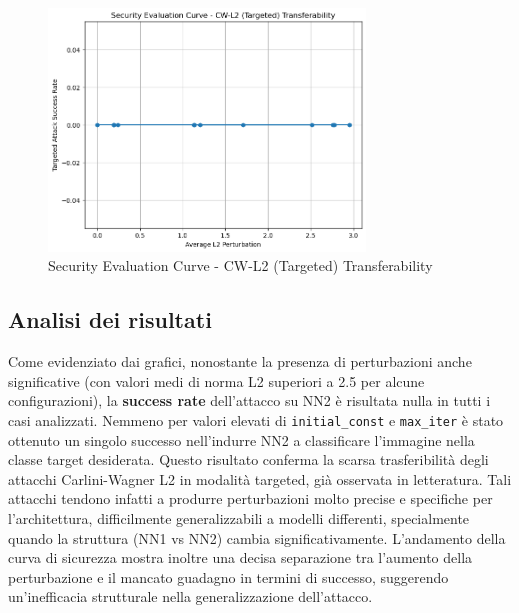         \begin{figure}[H]
          \centering
          \includegraphics[width=0.75\textwidth]{images/cwtrastargl2sec.png}
          \caption{Security Evaluation Curve - CW-L2 (Targeted) Transferability}
        \end{figure}

        \subsection{Analisi dei risultati}
            Come evidenziato dai grafici, nonostante la presenza di perturbazioni anche significative (con valori medi di norma L2 superiori a 2.5 per alcune configurazioni), la \textbf{success rate} dell’attacco su NN2 è risultata nulla in tutti i casi analizzati. Nemmeno per valori elevati di \texttt{initial\_const} e \texttt{max\_iter} è stato ottenuto un singolo successo nell’indurre NN2 a classificare l’immagine nella classe target desiderata.
            Questo risultato conferma la scarsa trasferibilità degli attacchi Carlini-Wagner L2 in modalità targeted, già osservata in letteratura. Tali attacchi tendono infatti a produrre perturbazioni molto precise e specifiche per l'architettura, difficilmente generalizzabili a modelli differenti, specialmente quando la struttura (NN1 vs NN2) cambia significativamente.
            L’andamento della curva di sicurezza mostra inoltre una decisa separazione tra l’aumento della perturbazione e il mancato guadagno in termini di successo, suggerendo un’inefficacia strutturale nella generalizzazione dell’attacco.


